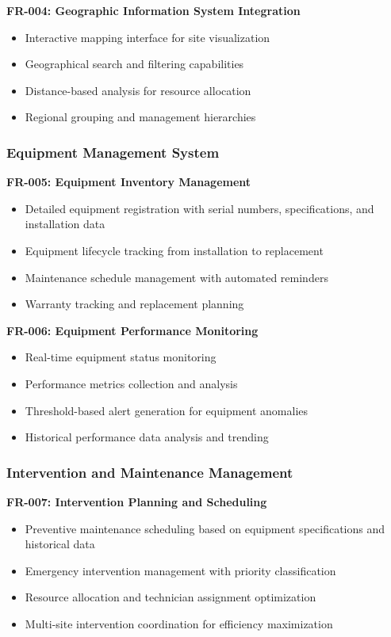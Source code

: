 \textbf{FR-004: Geographic Information System Integration}
\begin{itemize}
\item Interactive mapping interface for site visualization
\item Geographical search and filtering capabilities
\item Distance-based analysis for resource allocation
\item Regional grouping and management hierarchies
\end{itemize}

\subsubsection{Equipment Management System}
\textbf{FR-005: Equipment Inventory Management}
\begin{itemize}
\item Detailed equipment registration with serial numbers, specifications, and installation data
\item Equipment lifecycle tracking from installation to replacement
\item Maintenance schedule management with automated reminders
\item Warranty tracking and replacement planning
\end{itemize}

\textbf{FR-006: Equipment Performance Monitoring}
\begin{itemize}
\item Real-time equipment status monitoring
\item Performance metrics collection and analysis
\item Threshold-based alert generation for equipment anomalies
\item Historical performance data analysis and trending
\end{itemize}

\subsubsection{Intervention and Maintenance Management}
\textbf{FR-007: Intervention Planning and Scheduling}
\begin{itemize}
\item Preventive maintenance scheduling based on equipment specifications and historical data
\item Emergency intervention management with priority classification
\item Resource allocation and technician assignment optimization
\item Multi-site intervention coordination for efficiency maximization
\end{itemize}

